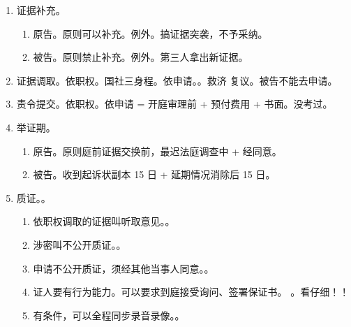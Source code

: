 \begin{enumerate}
\begin{enumerate}
\begin{enumerate}
\begin{enumerate}
                          \item {} \yjt 被告承担。
                          \item {} \yjt 原告。。
                        \end{enumerate}
                \end{enumerate}
          \item 复议维持。原行政行为 \yjt 原机关、复议机关共同证明。复议决定 \yjt 复议机关自己承担。
          \item 原告。
        \end{enumerate}
  \item 证据补充。
        \begin{enumerate}
          \item 原告。原则可以补充。例外。搞证据突袭，不予采纳。
          \item 被告。原则禁止补充。例外。第三人拿出新证据。
        \end{enumerate}
  \item 证据调取。\yi 依职权。国社三身程。\er 依申请。。救济 \yjt 复议。被告不能去申请。
  \item 责令提交。\yi 依职权。\er 依申请 = 开庭审理前 + 预付费用 + 书面。没考过。
  \item 举证期。
        \begin{enumerate}
          \item 原告。原则庭前证据交换前，最迟法庭调查中 + 经同意。
          \item 被告。收到起诉状副本 15 日 + 延期情况消除后 15 日。
        \end{enumerate}
  \item 质证。。
        \begin{enumerate}
          \item 依职权调取的证据叫听取意见。。
          \item 涉密叫不公开质证。。
          \item 申请不公开质证，须经其他当事人同意。。
          \item 证人要有行为能力。可以要求到庭接受询问、签署保证书。
                。看仔细！！
          \item 有条件，可以全程同步录音录像。。

\end{enumerate}
\end{enumerate}
